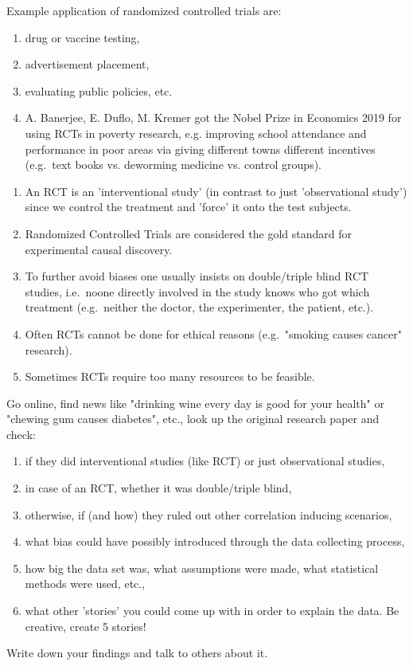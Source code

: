 \begin{Eg}
    Example application of randomized controlled trials are:
    \begin{enumerate}
        \item drug or vaccine testing,
        \item advertisement placement,
        \item evaluating public policies, etc.
        \item A. Banerjee, E. Duflo, M. Kremer got the Nobel Prize in Economics 2019 for using RCTs in poverty research, e.g.\: improving school attendance and performance in poor areas via giving different towns different incentives (e.g.\ text books vs. deworming medicine vs. control groups).
    \end{enumerate}
\end{Eg}

\begin{Disc}
    \begin{enumerate}
        \item An RCT is an 'interventional study' (in contrast to just 'observational study') since we control the treatment and 'force' it onto the test subjects.
        \item Randomized Controlled Trials are considered the gold standard for experimental causal discovery.
        \item To further avoid biases one usually insists on double/triple blind RCT studies, 
            i.e.\ noone directly involved in the study knows who got which treatment 
            (e.g.\ neither the doctor, the experimenter, the patient, etc.). 
        \item Often RCTs cannot be done for ethical reasons (e.g.\ "smoking causes cancer" research).
        \item Sometimes RCTs require too many resources to be feasible.
    \end{enumerate}
\end{Disc}


\begin{Exc}
    Go online, find news like "drinking wine every day is good for your health" or "chewing gum causes diabetes", etc., 
    look up the original research paper and check:
    \begin{enumerate}
        \item if they did interventional studies (like RCT) or just observational studies,
        \item in case of an RCT, whether it was double/triple blind,
        \item otherwise, if (and how) they ruled out other correlation inducing scenarios,
        \item what bias could have possibly introduced through the data collecting process,
        \item how big the data set was, what assumptions were made, what statistical methods were used, etc.,
        \item what other 'stories' you could come up with in order to explain the data. Be creative, create 5 stories!
    \end{enumerate}
    Write down your findings and talk to others about it.
\end{Exc}
